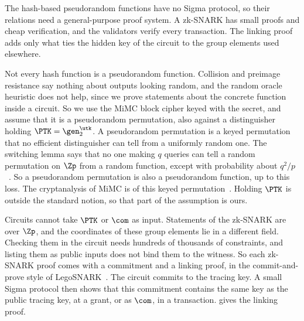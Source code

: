 The hash-based pseudorandom functions have no Sigma protocol, so their relations
need a general-purpose proof system. A zk-SNARK has small proofs and cheap
verification, and the validators verify every transaction. The linking
proof adds only what ties the hidden key of the circuit to the group elements
used elsewhere.

Not every hash function is a pseudorandom function. Collision and preimage
resistance say nothing about outputs looking random, and the random oracle
heuristic does not help, since we prove statements about the concrete function
inside a circuit. So we use the MiMC block cipher keyed with the secret, and
assume that it is a pseudorandom permutation, also against a distinguisher
holding $\PTK = \gen_2^{\utk}$. A pseudorandom permutation is a keyed
permutation that no efficient distinguisher can tell from a uniformly random
one. The switching lemma says that no one making $q$
queries can tell a random permutation on $\Zp$ from a random function, except
with probability about $q^2/p$~\cite{EC:BelRog06}. So a pseudorandom
permutation is also a pseudorandom function, up to this loss. The cryptanalysis of MiMC is of this keyed
permutation~\cite{AC:AGRRT16}. Holding $\PTK$ is outside the standard notion,
so that part of the assumption is ours.

Circuits cannot take $\PTK$ or $\com$ as input. Statements of the zk-SNARK are
over $\Zp$, and the coordinates of these group elements lie in a different
field. Checking them in the circuit needs hundreds of thousands of constraints,
and listing them as public inputs does not bind them to the witness.
So each zk-SNARK proof comes with a commitment and a linking proof, in the
commit-and-prove style of LegoSNARK~\cite{CCS:CamFioQue19}. The circuit commits
to the tracing key. A small Sigma protocol then shows that this commitment
contains the same key as the public tracing key, at a grant, or as $\com$, in a
transaction.  gives the linking proof.

